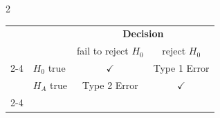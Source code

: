 \documentclass[8pt]{article}
\begin{document}
\begin{multicols}{2}
\begin{center}
\begin{tabular}{l l | c c}
\multicolumn{2}{c}{} & \multicolumn{2}{c}{\textbf{Decision}} \\
& & fail to reject $H_0$ &  reject $H_0$ \\
  \cline{2-4}
& $H_0$ true & $\checkmark$ &  Type 1 Error \\
\raisebox{1.5ex}{\textbf{Truth}} & $H_A$ true & Type 2 Error & $\checkmark$ \\
  \cline{2-4}
\end{tabular}
\end{center}

\end{multicols} %
\end{document}
